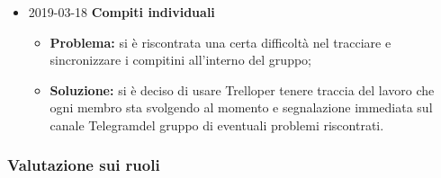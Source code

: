 \begin{itemize}
		\item 2019-03-18 \textbf{Compiti individuali} \\
		\begin{itemize}
			\item \textbf{Problema:} si è riscontrata una certa difficoltà nel tracciare e sincronizzare i compitini all'interno del gruppo;
			\item \textbf{Soluzione:} si è deciso di usare Trello\glosp per tenere traccia del lavoro che ogni membro sta svolgendo al momento e segnalazione immediata sul canale Telegram\glosp del gruppo di eventuali problemi riscontrati.
		\end{itemize}
		 		
\end{itemize}

\subsubsection{Valutazione sui ruoli}
